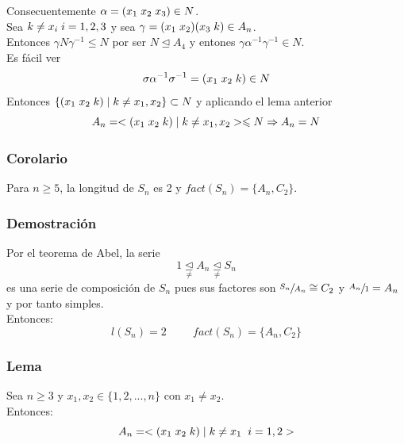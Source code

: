 \documentclass[11pt,a4paper]{article}
\begin{document}
Consecuentemente $\alpha = (x_{1} \hspace{0.1cm} x_{2} \hspace{0.1cm} x_{3}) \in N$. \\
Sea $k \neq x_{i} \hspace{0.1cm} i = 1, 2, 3$ y sea $\gamma = (x_{1} \hspace{0.1cm} x_{2}) (x_{3} \hspace{0.1cm} k) \in A_{n}$. \\
Entonces $\gamma N \gamma^{-1} \leqslant N$ por ser $N \unlhd A_{4}$ y entones $\gamma \alpha^{-1} \gamma^{-1} \in N$. \\
Es fácil ver
$$\sigma \alpha^{-1} \sigma^{-1} = (x_{1} \hspace{0.1cm} x_{2} \hspace{0.1cm} k) \in N$$
Entonces $\{(x_{1} \hspace{0.1cm} x_{2} \hspace{0.1cm} k) \mid k \neq x_{1}, x_{2}\} \subset N$ y aplicando el lema anterior
$$A_{n} = <(x_{1} \hspace{0.1cm} x_{2} \hspace{0.1cm} k) \mid k \neq x_{1}, x_{2}> \leqslant N\Rightarrow A_{n} = N$$

\subsubsection*{Corolario}

Para $n \geq 5$, la longitud de $S_{n}$ es 2 y $fact(S_{n}) = \{A_{n}, C_{2}\}$.

\subsubsection*{Demostración}

Por el teorema de Abel, la serie
$$1 \underset{\neq}{\unlhd} A_{n} \underset{\neq}{\unlhd} S_{n}$$
es una serie de composición de $S_{n}$ pues sus factores son $\sfrac{S_{n}}{A_{n}} \cong C_{2}$ y $\sfrac{A_{n}}{1} = A_{n}$ y por tanto simples. \\
Entonces:
$$l(S_{n}) = 2 \hspace{1cm} fact(S_{n}) = \{A_{n}, C_{2}\}$$

\subsubsection*{Lema}

Sea $n \geq 3$ y $x_{1}, x_{2} \in \{1,2,...,n\}$ con $x_{1} \neq x_{2}$. \\
Entonces:
$$A_{n} = <(x_{1} \hspace{0.1cm} x_{2} \hspace{0.1cm} k) \mid k \neq x_{1} \hspace{0.2cm} i=1,2>$$
\end{document}
